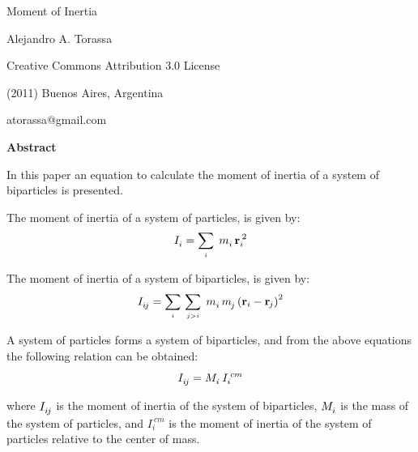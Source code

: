 \documentclass[11pt]{article}
\newcommand{\mM}{m}
\newcommand{\EM}{M}
\newcommand{\EI}{I}
\newcommand{\ri}{_i}
\newcommand{\dos}{^{\:2}}
\newcommand{\ccc}{^{\:cm}}
\newcommand{\vR}{\mathbf{r}}
\newcommand{\rj}{_{\hspace{-0.081em}j}}
\newcommand{\rij}{_{i\hspace{-0.081em}j}}
\begin{document}
\begin{center}

{\fontsize{24}{24}\selectfont Moment of Inertia}

\bigskip \medskip

{\fontsize{12}{12}\selectfont Alejandro A. Torassa}

\bigskip \medskip

\footnotesize

Creative Commons Attribution 3.0 License

(2011) Buenos Aires, Argentina

atorassa@gmail.com

\bigskip \medskip

\small

{\bf Abstract}

\bigskip

\parbox{84mm}{In this paper an equation to calculate the moment of inertia of a system of biparticles is presented.}

\end{center}

\normalsize

\bigskip \medskip

\noindent \hspace{+1.5em} The moment of inertia of a system of particles, is given by:
\begin{eqnarray*}
\EI\ri^{\vphantom{\dos}} = \sum_{\scriptscriptstyle i} \; \mM\ri^{\vphantom{\dos}} \, \vR\ri\dos
\end{eqnarray*}

\noindent \hspace{+1.5em} The moment of inertia of a system of biparticles, is given by:
\begin{eqnarray*}
\EI\rij^{\vphantom{\dos}} = \sum_{\scriptscriptstyle i} \, \sum_{\scriptscriptstyle j>i} \; \mM\ri^{\vphantom{\dos}} \, \mM\rj^{\vphantom{\dos}} \left( \vR\ri - \vR\rj \right)^2
\end{eqnarray*}

\noindent \hspace{+1.5em} A system of particles forms a system of biparticles, and from the above equations the following relation can be obtained:
\begin{eqnarray*}
\EI\rij^{\vphantom{\ccc}} = \EM\ri^{\vphantom{\ccc}} \: \EI\ri\ccc
\end{eqnarray*}

\noindent where $\EI\rij^{\vphantom{\ccc}}$ is the moment of inertia of the system of biparticles, $\EM\ri^{\vphantom{\ccc}}$ is the mass of the system of particles, and $\EI\ri\ccc$ is the moment of inertia of the system of particles relative to the center of mass.
\end{document}
